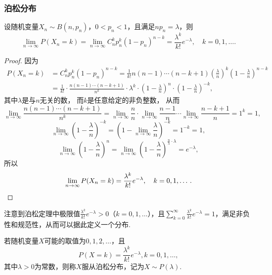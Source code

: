 \subsubsection{泊松分布}
\begin{theorem}[泊松定理]
设随机变量\(X_n \sim B(n,p_n)\)，\(0 < p_n < 1\)，且满足\(n p_n = \lambda\)，则\begin{equation}
	\lim\limits_{n\to\infty} P(X_n=k)
	= \lim\limits_{n\to\infty} C_n^k p_n^k (1-p_n)^{n-k}
	= \frac{\lambda^k}{k!} e^{-\lambda},
	\quad k=0,1,\dotsc.
\end{equation}
\begin{proof}
因为\begin{align*}
	P(X_n=k) &= C_n^k p_n^k (1-p_n)^{n-k}
	= \frac{1}{k!} n(n-1)\dotsm(n-k+1)
	\left(\frac{\lambda}{n}\right)^k
	\left(1-\frac{\lambda}{n}\right)^{n-k} \\
	&= \frac{1}{k!}
	\cdot \frac{n(n-1)\dotsm(n-k+1)}{n^k}
	\cdot \lambda^k
	\cdot \left(1-\frac{\lambda}{n}\right)^n
	\cdot \left(1-\frac{\lambda}{n}\right)^{-k},
\end{align*}
其中\(\lambda\)是与\(n\)无关的数，
而\(k\)是任意给定的非负整数，
从而\[
	\lim\limits_{n\to\infty} \frac{n(n-1)\dotsm(n-k+1)}{n^k}
	= \lim\limits_{n\to\infty} \frac{n}{n}
	\cdot \lim\limits_{n\to\infty} \frac{n-1}{n}
	\dotsm \lim\limits_{n\to\infty} \frac{n-k+1}{n}
	= 1^k = 1,
\]\[
	\lim\limits_{n\to\infty} \left(1-\frac{\lambda}{n}\right)^{-k}
	= \left(1-\lim\limits_{n\to\infty} \frac{\lambda}{n}\right)^{-k}
	= 1^{-k} = 1,
\]\[
	\lim\limits_{n\to\infty} \left(1-\frac{\lambda}{n}\right)^n
	= \lim\limits_{n\to\infty}
	\left(1-\frac{\lambda}{n}\right)^{\frac{n}{\lambda} \cdot \lambda}
	= e^{-\lambda},
\]
所以\[
	\lim\limits_{n\to\infty} P(X_n=k)
	= \frac{\lambda^k}{k!} e^{-\lambda},
	\quad k=0,1,\dotsc.
	\qedhere
\]
\end{proof}
\end{theorem}

注意到泊松定理中极限值\(\frac{\lambda^k}{k!} e^{-\lambda} > 0\)（\(k=0,1,\dotsc\)），且\(\sum\limits_{k=0}^\infty \frac{\lambda^k}{k!} e^{-\lambda} = 1\)，满足非负性和规范性，从而可以据此定义一个分布.

\begin{definition}
若随机变量\(X\)可能的取值为\(0,1,2,\dotsc\)，且\begin{equation}\label{equation:随机变量及其分布.泊松分布的分布律}
P(X=k) = \frac{\lambda^k}{k!} e^{-\lambda}, k=0,1,\dotsc,
\end{equation}其中\(\lambda > 0\)为常数，则称\(X\)服从泊松分布，记为\(X \sim P(\lambda)\).
\end{definition}


